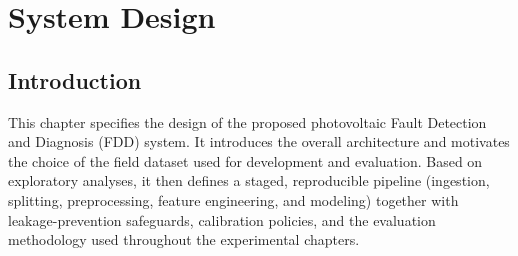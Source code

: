 \chapter{System Design}
\label{ch:conception}

\section{Introduction}

This chapter specifies the design of the proposed photovoltaic Fault Detection and Diagnosis (FDD) system. It introduces the overall architecture and motivates the choice of the field dataset used for development and evaluation. Based on exploratory analyses, it then defines a staged, reproducible pipeline (ingestion, splitting, preprocessing, feature engineering, and modeling) together with leakage-prevention safeguards, calibration policies, and the evaluation methodology used throughout the experimental chapters.




